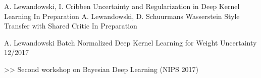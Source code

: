 \begin{cventries}
    \cventry
    {A. Lewandowski, I. Cribben}
    {Uncertainty and Regularization in Deep Kernel Learning}
    {In Preparation}
    {
    }
    \cventry
    {A. Lewandowski, D. Schuurmans}
    {Wasserstein Style Transfer with Shared Critic}
    {In Preparation}
    {
    }

  \cventry
    {A. Lewandowski}
    {Batch Normalized Deep Kernel Learning for Weight
Uncertainty}
    {12/2017}
    {
      \begin{cvitems}
    	\item[>>] Second workshop on Bayesian Deep Learning (NIPS 2017)
      \end{cvitems}
    }
  \end{cventries}

% 
% 
